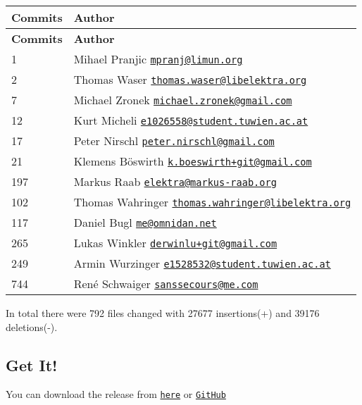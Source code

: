 \tabulinesep=1mm
\begin{longtabu} spread 0pt [c]{*{2}{|X[-1]}|}
\hline
\rowcolor{\tableheadbgcolor}\textbf{ Commits }&\textbf{ Author  }\\
\endfirsthead
\hline
\endfoot
\hline
\rowcolor{\tableheadbgcolor}\textbf{ Commits }&\textbf{ Author  }\\
 &Mihael Pranjic \href{mailto:mpranj@limun.org}{\tt mpranj@limun.\+org} \\
2 &Thomas Waser \href{mailto:thomas.waser@libelektra.org}{\tt thomas.\+waser@libelektra.\+org} \\
7 &Michael Zronek \href{mailto:michael.zronek@gmail.com}{\tt michael.\+zronek@gmail.\+com} \\
12 &Kurt Micheli \href{mailto:e1026558@student.tuwien.ac.at}{\tt e1026558@student.\+tuwien.\+ac.\+at} \\
17 &Peter Nirschl \href{mailto:peter.nirschl@gmail.com}{\tt peter.\+nirschl@gmail.\+com} \\
21 &Klemens Böswirth \href{mailto:k.boeswirth+git@gmail.com}{\tt k.\+boeswirth+git@gmail.\+com} \\
197 &Markus Raab \href{mailto:elektra@markus-raab.org}{\tt elektra@markus-\/raab.\+org} \\
102 &Thomas Wahringer \href{mailto:thomas.wahringer@libelektra.org}{\tt thomas.\+wahringer@libelektra.\+org} \\
117 &Daniel Bugl \href{mailto:me@omnidan.net}{\tt me@omnidan.\+net} \\
265 &Lukas Winkler \href{mailto:derwinlu+git@gmail.com}{\tt derwinlu+git@gmail.\+com} \\
249 &Armin Wurzinger \href{mailto:e1528532@student.tuwien.ac.at}{\tt e1528532@student.\+tuwien.\+ac.\+at} \\
744 &René Schwaiger \href{mailto:sanssecours@me.com}{\tt sanssecours@me.\+com} \\
\end{longtabu}
In total there were 792 files changed with 27677 insertions(+) and 39176 deletions(-\/).

\subsection*{Get It!}

You can download the release from \href{https://www.libelektra.org/ftp/elektra/releases/elektra-0.8.24.tar.gz}{\tt here} or \href{https://github.com/ElektraInitiative/ftp/blob/master/releases/elektra-0.8.24.tar.gz?raw=true}{\tt Git\+Hub}

